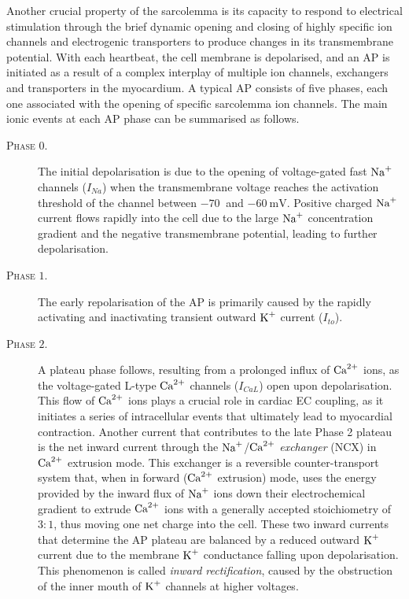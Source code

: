 \vspace{0.2cm}
Another crucial property of the sarcolemma is its capacity to respond to electrical stimulation through the brief dynamic opening and closing of highly specific ion channels and electrogenic transporters to produce changes in its transmembrane potential. With each heartbeat, the cell membrane is depolarised, and an AP is initiated as a result of a complex interplay of multiple ion channels, exchangers and transporters in the myocardium. A typical AP consists of five phases, each one associated with the opening of specific sarcolemma ion channels. The main ionic events at each AP phase can be summarised as follows.

\begin{description}
	\item[\textsc{Phase $0$.}] The initial depolarisation is due to the opening of voltage-gated fast $\textrm{Na}^{+}$ channels ($I_{Na}$) when the transmembrane voltage reaches the activation threshold of the channel between $\SI{-70}{}$ and $\SI{-60}{\milli\volt}$. Positive charged $\textrm{Na}^{+}$ current flows rapidly into the cell due to the large $\textrm{Na}^{+}$ concentration gradient and the negative transmembrane potential, leading to further depolarisation.
	\item[\textsc{Phase $1$.}] The early repolarisation of the AP is primarily caused by the rapidly activating and inactivating transient outward $\textrm{K}^{+}$ current ($I_{to}$).
	\item[\textsc{Phase $2$.}] A plateau phase follows, resulting from a prolonged influx of $\textrm{Ca}^{2+}$ ions, as the voltage-gated L-type $\textrm{Ca}^{2+}$ channels ($I_{CaL}$) open upon depolarisation. This flow of $\textrm{Ca}^{2+}$ ions plays a crucial role in cardiac EC coupling, as it initiates a series of intracellular events that ultimately lead to myocardial contraction. Another current that contributes to the late Phase 2 plateau is the net inward current through the $\textrm{Na}^{+}$/$\textrm{Ca}^{2+}$ \textit{exchanger} (\acs{NCX}) in $\textrm{Ca}^{2+}$ extrusion mode. This exchanger is a reversible counter-transport system that, when in forward ($\textrm{Ca}^{2+}$ extrusion) mode, uses the energy provided by the inward flux of $\textrm{Na}^{+}$ ions down their electrochemical gradient to extrude $\textrm{Ca}^{2+}$ ions with a generally accepted stoichiometry of $3\colon 1$, thus moving one net charge into the cell. These two inward currents that determine the AP plateau are balanced by a reduced outward $\textrm{K}^{+}$ current due to the membrane $\textrm{K}^{+}$ conductance falling upon depolarisation. This phenomenon is called \textit{inward rectification}, caused by the obstruction of the inner mouth of $\textrm{K}^{+}$ channels at higher voltages.

\end{description}
